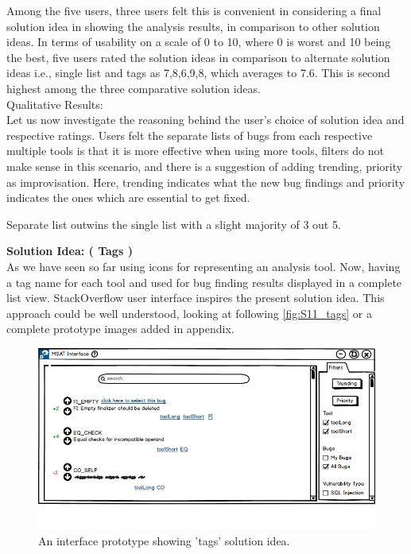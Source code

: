 Among the five users, three users felt this is convenient in considering a final solution idea in showing the analysis results, in comparison to other solution ideas.  In terms of usability on a scale of 0 to 10, where 0 is worst and 10 being the best, five users rated the solution ideas in comparison to alternate solution ideas i.e., single list and tags as 7,8,6,9,8, which averages to 7.6. This is second highest among the three comparative solution ideas. \\


Qualitative Results: \\

Let us now investigate the reasoning behind the user’s choice of solution idea and respective ratings. Users felt the separate lists of bugs from each respective multiple tools is that it is more effective when using more tools, filters do not make sense in this scenario, and there is a suggestion of adding trending, priority as improvisation. Here, trending indicates what the new bug findings and priority indicates the ones which are essential to get fixed. \\

\begin{myboxi}
	Separate list outwins the single list with a slight majority of 3 out 5. \\
\end{myboxi}


\textbf{Solution Idea: ( Tags )} \\

As we have seen so far using icons for representing an analysis tool. Now, having a tag name for each tool and used for bug finding results displayed in a complete list view. StackOverflow user interface inspires the present solution idea. This approach could be well understood, looking at following \autoref{fig:S11_tags} or a complete prototype images added in appendix. 
\\

\begin{figure}[hbt!]
	\centering
	\includegraphics[width=\linewidth]{figures/solution_ideas_snaps/S11_tags}
	\caption{An interface prototype showing 'tags' solution idea.}
	\label{fig:S11_tags}
\end{figure}

